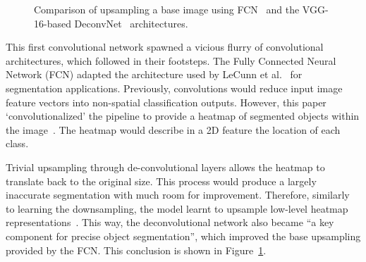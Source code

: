 \documentclass[11pt,twoside]{report}
\begin{document}
\begin{figure}[H]
  \centering
  \caption{Comparison of upsampling a base image using FCN~\cite{fully-CNNs-for-semantic-segmentation} and the VGG-16-based DeconvNet~\cite{noh2015learning, simonyan2014very} architectures.}\label{fig:fcn-vs-deconvnet}
\end{figure}

This first convolutional network spawned a vicious flurry of convolutional architectures, which followed in their footsteps. The Fully Connected Neural Network (FCN) adapted the architecture used by LeCunn et al.~\cite{Lenet1998} for segmentation applications. Previously, convolutions would reduce input image feature vectors into non-spatial classification outputs. However, this paper `convolutionalized' the pipeline to provide a heatmap of segmented objects within the image~\cite{fully-CNNs-for-semantic-segmentation}. The heatmap would describe in a 2D feature the location of each class.

Trivial upsampling through de-convolutional layers allows the heatmap to translate back to the original size. This process would produce a largely inaccurate segmentation with much room for improvement. Therefore, similarly to learning the downsampling, the model learnt to upsample low-level heatmap representations~\cite{noh2015learning}. This way, the deconvolutional network also became ``a key component for precise object segmentation'', which improved the base upsampling provided by the FCN. This conclusion is shown in Figure~\ref{fig:fcn-vs-deconvnet}.
\end{document}
